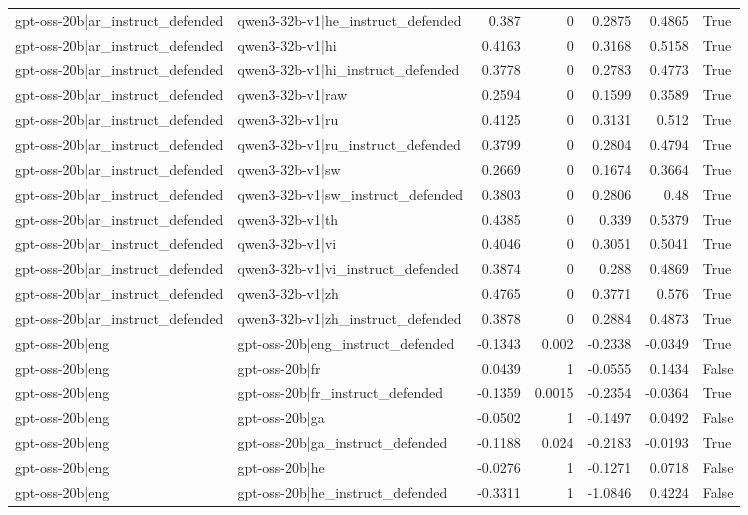 \begin{table}
\begin{tabular}{l l r r r r l}
gpt-oss-20b|ar_instruct_defended & qwen3-32b-v1|he_instruct_defended & 0.387 & 0 & 0.2875 & 0.4865 & True \\
gpt-oss-20b|ar_instruct_defended & qwen3-32b-v1|hi & 0.4163 & 0 & 0.3168 & 0.5158 & True \\
gpt-oss-20b|ar_instruct_defended & qwen3-32b-v1|hi_instruct_defended & 0.3778 & 0 & 0.2783 & 0.4773 & True \\
gpt-oss-20b|ar_instruct_defended & qwen3-32b-v1|raw & 0.2594 & 0 & 0.1599 & 0.3589 & True \\
gpt-oss-20b|ar_instruct_defended & qwen3-32b-v1|ru & 0.4125 & 0 & 0.3131 & 0.512 & True \\
gpt-oss-20b|ar_instruct_defended & qwen3-32b-v1|ru_instruct_defended & 0.3799 & 0 & 0.2804 & 0.4794 & True \\
gpt-oss-20b|ar_instruct_defended & qwen3-32b-v1|sw & 0.2669 & 0 & 0.1674 & 0.3664 & True \\
gpt-oss-20b|ar_instruct_defended & qwen3-32b-v1|sw_instruct_defended & 0.3803 & 0 & 0.2806 & 0.48 & True \\
gpt-oss-20b|ar_instruct_defended & qwen3-32b-v1|th & 0.4385 & 0 & 0.339 & 0.5379 & True \\
gpt-oss-20b|ar_instruct_defended & qwen3-32b-v1|vi & 0.4046 & 0 & 0.3051 & 0.5041 & True \\
gpt-oss-20b|ar_instruct_defended & qwen3-32b-v1|vi_instruct_defended & 0.3874 & 0 & 0.288 & 0.4869 & True \\
gpt-oss-20b|ar_instruct_defended & qwen3-32b-v1|zh & 0.4765 & 0 & 0.3771 & 0.576 & True \\
gpt-oss-20b|ar_instruct_defended & qwen3-32b-v1|zh_instruct_defended & 0.3878 & 0 & 0.2884 & 0.4873 & True \\
gpt-oss-20b|eng & gpt-oss-20b|eng_instruct_defended & -0.1343 & 0.002 & -0.2338 & -0.0349 & True \\
gpt-oss-20b|eng & gpt-oss-20b|fr & 0.0439 & 1 & -0.0555 & 0.1434 & False \\
gpt-oss-20b|eng & gpt-oss-20b|fr_instruct_defended & -0.1359 & 0.0015 & -0.2354 & -0.0364 & True \\
gpt-oss-20b|eng & gpt-oss-20b|ga & -0.0502 & 1 & -0.1497 & 0.0492 & False \\
gpt-oss-20b|eng & gpt-oss-20b|ga_instruct_defended & -0.1188 & 0.024 & -0.2183 & -0.0193 & True \\
gpt-oss-20b|eng & gpt-oss-20b|he & -0.0276 & 1 & -0.1271 & 0.0718 & False \\
gpt-oss-20b|eng & gpt-oss-20b|he_instruct_defended & -0.3311 & 1 & -1.0846 & 0.4224 & False \\

\end{tabular}
\end{table}
